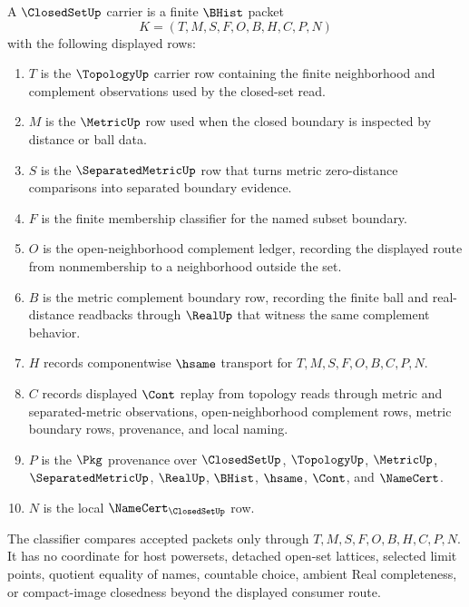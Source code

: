 \begin{definition}\label{def:closedset-carrier}
A $\ClosedSetUp$ carrier is a finite $\BHist$ packet
$$
K=(T,M,S,F,O,B,H,C,P,N)
$$
with the following displayed rows:
\begin{enumerate}
\item $T$ is the $\TopologyUp$ carrier row containing the finite neighborhood and complement observations used by the closed-set read.
\item $M$ is the $\MetricUp$ row used when the closed boundary is inspected by distance or ball data.
\item $S$ is the $\SeparatedMetricUp$ row that turns metric zero-distance comparisons into separated boundary evidence.
\item $F$ is the finite membership classifier for the named subset boundary.
\item $O$ is the open-neighborhood complement ledger, recording the displayed route from nonmembership to a neighborhood outside the set.
\item $B$ is the metric complement boundary row, recording the finite ball and real-distance readbacks through $\RealUp$ that witness the same complement behavior.
\item $H$ records componentwise $\hsame$ transport for $T,M,S,F,O,B,C,P,N$.
\item $C$ records displayed $\Cont$ replay from topology reads through metric and separated-metric observations, open-neighborhood complement rows, metric boundary rows, provenance, and local naming.
\item $P$ is the $\Pkg$ provenance over $\ClosedSetUp$, $\TopologyUp$, $\MetricUp$, $\SeparatedMetricUp$, $\RealUp$, $\BHist$, $\hsame$, $\Cont$, and $\NameCert$.
\item $N$ is the local $\NameCert_{\ClosedSetUp}$ row.
\end{enumerate}
The classifier compares accepted packets only through $T,M,S,F,O,B,H,C,P,N$. It has no coordinate for host powersets, detached open-set lattices, selected limit points, quotient equality of names, countable choice, ambient Real completeness, or compact-image closedness beyond the displayed consumer route.
\end{definition}

